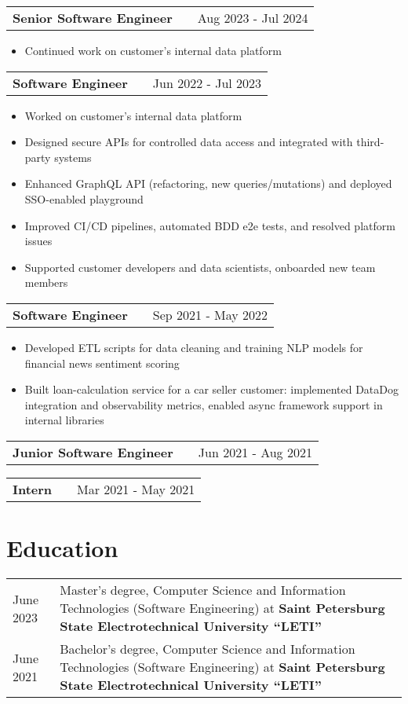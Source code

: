 \documentclass[a4paper,12pt]{article}
\makeatletter
\newenvironment{jobshort}[2]
    {
    \begin{tabularx}{\linewidth}{@{}l X r@{}}
    \textbf{#1} & \hfill &  #2 \\[3.75pt]
    \end{tabularx}
    }
    {
    }
\newenvironment{joblong}[2]
    {
    \begin{tabularx}{\linewidth}{@{}l X r@{}}
    \textbf{#1} & \hfill &  #2 \\[3.75pt]
    \end{tabularx}
    \begin{minipage}[t]{\linewidth}
    \begin{itemize}[nosep,after=\strut, leftmargin=1em, itemsep=3pt,label=--]
    }
    {
    \end{itemize}
    \end{minipage}
    }
\makeatother
\begin{document}
\begin{joblong}{Senior Software Engineer}{Aug 2023 - Jul 2024}
\item Continued work on customer's internal data platform
\end{joblong}

\begin{joblong}{Software Engineer}{Jun 2022 - Jul 2023}
\item Worked on customer's internal data platform
\item Designed secure APIs for controlled data access and integrated with third-party systems
\item Enhanced GraphQL API (refactoring, new queries/mutations) and deployed SSO-enabled playground
\item Improved CI/CD pipelines, automated BDD e2e tests, and resolved platform issues
\item Supported customer developers and data scientists, onboarded new team members
\end{joblong}

\begin{joblong}{Software Engineer}{Sep 2021 - May 2022}
\item Developed ETL scripts for data cleaning and training NLP models for financial news sentiment scoring
\item Built loan-calculation service for a car seller customer: implemented DataDog integration and observability metrics, enabled async framework support in internal libraries
\end{joblong}

\begin{jobshort}{Junior Software Engineer}{Jun 2021 - Aug 2021}
\end{jobshort}

\begin{jobshort}{Intern}{Mar 2021 - May 2021}
\end{jobshort}

\section{Education}
\begin{tabularx}{\linewidth}{@{}l X@{}}
June 2023 & Master’s degree, Computer Science and Information Technologies (Software Engineering) at \textbf{Saint Petersburg State Electrotechnical University “LETI”} \\

June 2021 & Bachelor’s degree, Computer Science and Information Technologies (Software Engineering) at \textbf{Saint Petersburg State Electrotechnical University “LETI”} \\
\end{tabularx}
\end{document}
